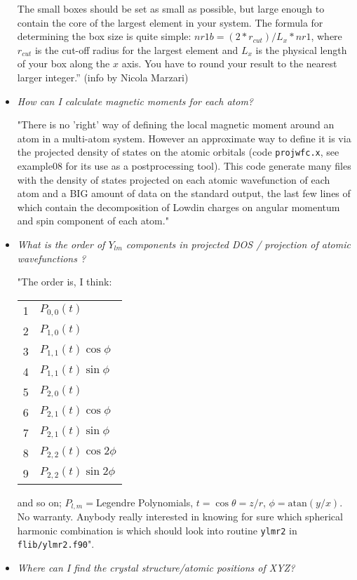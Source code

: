 \documentclass[12pt,a4paper]{article}
\begin{document}
\begin{itemize}
The small boxes should be set as small as possible, but large enough to 
contain the core of the largest element in your system. The formula for 
determining the box size is quite simple:
$nr1b=(2*r_{cut})/L_x*nr1$,
where $r_{cut}$ is the cut-off radius for the largest element and $L_x$ 
is the physical length of your box along the $x$ axis. You have to round 
your result to the nearest larger integer.'' (info by Nicola Marzari)

\item {\em How can I calculate magnetic moments for each atom?}

"There is no 'right' way of defining the local magnetic moment around
 an atom in a multi-atom system. However an approximate way to define
 it is via the projected density of states on the atomic orbitals (code 
 {\tt projwfc.x}, see example08 for its use as a postprocessing tool). 
 This code generate many files with the density of states projected 
 on each atomic wavefunction of each atom and a BIG amount of data 
 on the standard output, the last few lines of which contain the 
 decomposition of Lowdin charges on angular momentum and spin component 
 of each atom."

\item {\em What is the order of $Y_{lm}$ components in projected DOS /
projection of atomic wavefunctions ?}

"The order is, I think:

\begin{tabular}{rl}
1& $P_{0,0}(t)$           \\
2& $P_{1,0}(t)$           \\
3& $P_{1,1}(t) \cos\phi$ \\
4& $P_{1,1}(t) \sin\phi$ \\
5& $P_{2,0}(t)$           \\
6& $P_{2,1}(t) \cos\phi$ \\
7& $P_{2,1}(t) \sin\phi$ \\
8& $P_{2,2}(t) \cos 2\phi$\\
9& $P_{2,2}(t) \sin 2\phi$\\
\end{tabular}

and so on; $P_{l,m}=$Legendre Polynomials, $t=\cos\theta=z/r$, $\phi=\mbox{atan}(y/x)$.
No warranty. Anybody really interested in knowing for sure which
spherical harmonic combination is which should look into routine
\texttt{ylmr2} in \texttt{flib/ylmr2.f90}".

\item {\em Where can I find the crystal structure/atomic positions of XYZ?}


\end{itemize}
\end{document}
